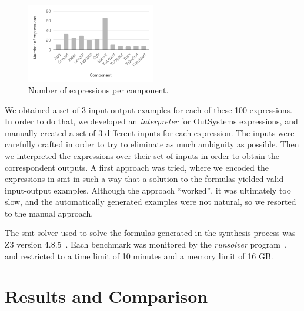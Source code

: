 \begin{figure}
  \centering
  \includegraphics[width=0.5\textwidth]{assets/bar-chart-components-freq-95.pdf}
  \caption{Number of expressions per component.}
  \label{fig:bar-chart-components-freq-95}
\end{figure}

We obtained a set of 3 input-output examples for each of these 100 expressions.
In order to do that, we developed an \textit{interpreter} for OutSystems
expressions, and manually created a set of 3 different inputs for each
expression.
The inputs were carefully crafted in order to try to eliminate as much ambiguity
as possible.
Then we interpreted the expressions over their set of inputs in order to
obtain the correspondent outputs.
A first approach was tried, where we encoded the expressions in \gls{smt} in
such a way that a solution to the formulas yielded valid input-output examples.
Although the approach ``worked'', it was ultimately too slow, and the
automatically generated examples were not natural, so we resorted to the manual
approach.

The \gls{smt} solver used to solve the formulas generated in the synthesis
process was Z3 version 4.8.5~\cite{DeMoura:2008:ZES}.
Each benchmark was monitored by the \textit{runsolver}
program~\cite{Roussel:2011:JSAT}, and restricted to a time limit of 10 minutes
and a memory limit of 16 GB.



\section{Results and Comparison}
\label{sec:results-and-comparison}


